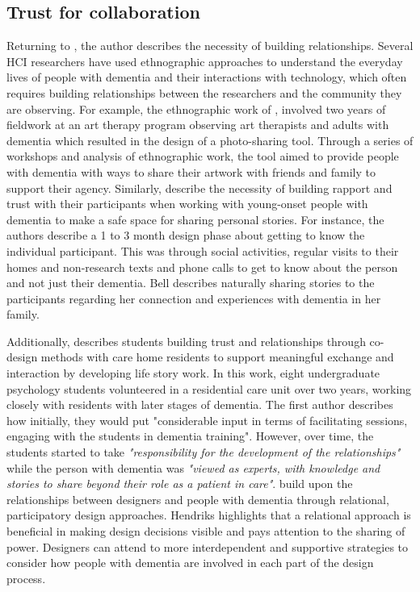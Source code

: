\subsection{Trust for collaboration}
\label{BL:Trust}
Returning to \cite{lindsay_empathy_2012}, the author describes the necessity of building relationships. Several HCI researchers have used ethnographic approaches to understand the everyday lives of people with dementia and their interactions with technology, which often requires building relationships between the researchers and the community they are observing. For example, the ethnographic work of \cite{lazar_supporting_2017}, involved two years of fieldwork at an art therapy program observing art therapists and adults with dementia which resulted in the design of a photo-sharing tool. Through a series of workshops and analysis of ethnographic work, the tool aimed to provide people with dementia with ways to share their artwork with friends and family to support their agency. Similarly, \cite{bell2019collaborative} describe the necessity of building rapport and trust with their participants when working with young-onset people with dementia to make a safe space for sharing personal stories. For instance, the authors describe a 1 to 3 month design phase about getting to know the individual participant. This was through social activities, regular visits to their homes and non-research texts and phone calls to get to know about the person and not just their dementia. Bell describes naturally sharing stories to the participants regarding her connection and experiences with dementia in her family. 

Additionally, \cite{foley_student_2020} describes students building trust and relationships through co-design methods with care home residents to support meaningful exchange and interaction by developing life story work. In this work, eight undergraduate psychology students volunteered in a residential care unit over two years, working closely with residents with later stages of dementia. The first author describes how initially, they would put "considerable input in terms of facilitating sessions, engaging with the students in dementia training". However, over time, the students started to take \textit{"responsibility for the development of the relationships"} while the person with dementia was \textit{"viewed as experts, with knowledge and stories to share beyond their role as a patient in care"\citep[pg.9]{foley_student_2020}}. \cite{hendriks_valuing_2018} build upon the relationships between designers and people with dementia through relational, participatory design approaches. Hendriks highlights that a relational approach is beneficial in making design decisions visible and pays attention to the sharing of power. Designers can attend to more interdependent and supportive strategies to consider how people with dementia are involved in each part of the design process. 

